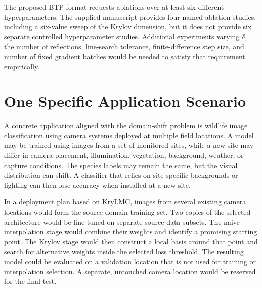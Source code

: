 \documentclass[11pt,a4paper]{article}
\begin{document}
The proposed BTP format requests ablations over at least six different hyperparameters. The supplied manuscript provides four named ablation studies, including a six-value sweep of the Krylov dimension, but it does not provide six separate controlled hyperparameter studies. Additional experiments varying $\delta$, the number of reflections, line-search tolerance, finite-difference step size, and number of fixed gradient batches would be needed to satisfy that requirement empirically.

\section{One Specific Application Scenario}

A concrete application aligned with the domain-shift problem is wildlife image classification using camera systems deployed at multiple field locations. A model may be trained using images from a set of monitored sites, while a new site may differ in camera placement, illumination, vegetation, background, weather, or capture conditions. The species labels may remain the same, but the visual distribution can shift. A classifier that relies on site-specific backgrounds or lighting can then lose accuracy when installed at a new site.

In a deployment plan based on KryLMC, images from several existing camera locations would form the source-domain training set. Two copies of the selected architecture would be fine-tuned on separate source-data subsets. The naive interpolation stage would combine their weights and identify a promising starting point. The Krylov stage would then construct a local basis around that point and search for alternative weights inside the selected loss threshold. The resulting model could be evaluated on a validation location that is not used for training or interpolation selection. A separate, untouched camera location would be reserved for the final test.
\end{document}
